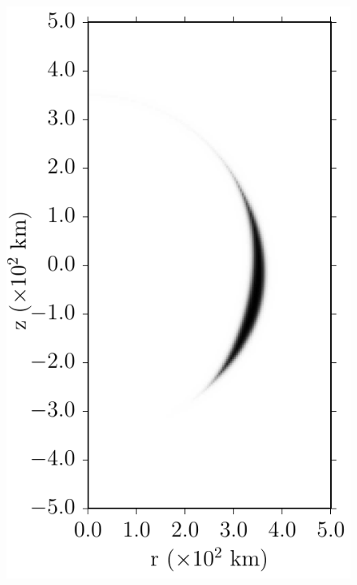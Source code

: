 \documentclass[iop,apj]{emulateapj}
\begin{document}
\begin{figure}[ht]
  \begin{minipage}{0.24\textwidth}
    \includegraphics[width=\linewidth]{figures/cf_initcond_rhoddt-7.2/profile75_mpole-2_r-35e6_a-24e5_init.pdf}
  \end{minipage} \hfill
  \begin{minipage}{0.24\textwidth}

\end{minipage}
\end{figure}
\end{document}

